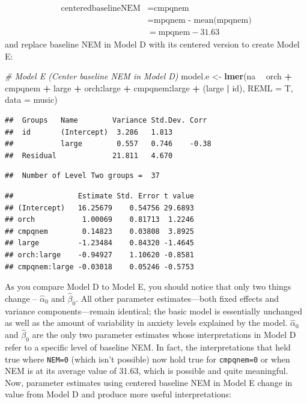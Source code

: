 \documentclass[
]{krantz}
\newenvironment{Shaded}{\begin{snugshade}}{\end{snugshade}}
\newcommand{\CommentTok}[1]{\textcolor[rgb]{0.37,0.37,0.37}{\textit{#1}}}
\newcommand{\DataTypeTok}[1]{\textcolor[rgb]{0.27,0.27,0.27}{#1}}
\newcommand{\KeywordTok}[1]{\textcolor[rgb]{0.27,0.27,0.27}{\textbf{#1}}}
\newcommand{\NormalTok}[1]{#1}
\newcommand{\OperatorTok}[1]{\textcolor[rgb]{0.43,0.43,0.43}{\textbf{#1}}}
\newcommand{\StringTok}[1]{\textcolor[rgb]{0.5,0.5,0.5}{#1}}
\begin{document}
\begin{align*}
\textrm{centeredbaselineNEM} & = \textrm{cmpqnem} \\
 & = \textrm{mpqnem - mean(mpqnem)} \\
 & = \textrm{mpqnem} - 31.63
\end{align*}
and replace baseline NEM in Model D with its centered version to create Model E:

\begin{Shaded}
\begin{Highlighting}[]
\CommentTok{# Model E (Center baseline NEM in Model D)}
\NormalTok{model.e <-}\StringTok{ }\KeywordTok{lmer}\NormalTok{(na }\OperatorTok{~}\StringTok{ }\NormalTok{orch }\OperatorTok{+}\StringTok{ }\NormalTok{cmpqnem }\OperatorTok{+}\StringTok{ }\NormalTok{large }\OperatorTok{+}\StringTok{ }\NormalTok{orch}\OperatorTok{:}\NormalTok{large }\OperatorTok{+}\StringTok{ }
\StringTok{  }\NormalTok{cmpqnem}\OperatorTok{:}\NormalTok{large }\OperatorTok{+}\StringTok{ }\NormalTok{(large }\OperatorTok{|}\StringTok{ }\NormalTok{id), }\DataTypeTok{REML =}\NormalTok{ T, }\DataTypeTok{data =}\NormalTok{ music)}
\end{Highlighting}
\end{Shaded}

\begin{verbatim}
##  Groups   Name        Variance Std.Dev. Corr 
##  id       (Intercept)  3.286   1.813         
##           large        0.557   0.746    -0.38
##  Residual             21.811   4.670
\end{verbatim}

\begin{verbatim}
##  Number of Level Two groups =  37
\end{verbatim}

\begin{verbatim}
##               Estimate Std. Error t value
## (Intercept)   16.25679    0.54756 29.6893
## orch           1.00069    0.81713  1.2246
## cmpqnem        0.14823    0.03808  3.8925
## large         -1.23484    0.84320 -1.4645
## orch:large    -0.94927    1.10620 -0.8581
## cmpqnem:large -0.03018    0.05246 -0.5753
\end{verbatim}

As you compare Model D to Model E, you should notice that only two things change -- \(\hat{\alpha}_{0}\) and \(\hat{\beta}_{0}\). All other parameter estimates---both fixed effects and variance components---remain identical; the basic model is essentially unchanged as well as the amount of variability in anxiety levels explained by the model. \(\hat{\alpha}_{0}\) and \(\hat{\beta}_{0}\) are the only two parameter estimates whose interpretations in Model D refer to a specific level of baseline NEM. In fact, the interpretations that held true where \texttt{NEM=0} (which isn't possible) now hold true for \texttt{cmpqnem=0} or when NEM is at its average value of 31.63, which is possible and quite meaningful. Now, parameter estimates using centered baseline NEM in Model E change in value from Model D and produce more useful interpretations:
\end{document}

